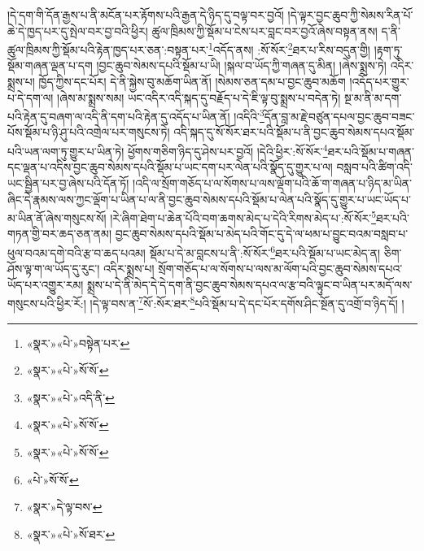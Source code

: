 །དེ་དག་གི་དོན་རྒྱས་པ་ནི་མངོན་པར་རྟོགས་པའི་རྒྱན་དེ་ཉིད་དུ་བལྟ་བར་བྱའོ། །དེ་ལྟར་བྱང་ཆུབ་ཀྱི་སེམས་རིན་པོ་ཆེ་དེ་ཁྱད་པར་དུ་སྤེལ་བར་བྱ་བའི་ཕྱིར། ཚུལ་ཁྲིམས་ཀྱི་སྡོམ་པ་ངེས་པར་བླང་བར་བྱའོ་ཞེས་བསྟན་ནས། ད་ནི་ཚུལ་ཁྲིམས་ཀྱི་སྡོམ་པའི་རྟེན་ཁྱད་པར་ཅན་:བསྟན་པར་\footnote{«སྣར་»«པེ་»བསྟེན་པར་}འདོད་ནས། :སོ་སོར་\footnote{«སྣར་»«པེ་»སོ་སོ་}ཐར་པ་རིས་བདུན་གྱི། །རྟག་ཏུ་སྡོམ་གཞན་ལྡན་པ་དག །བྱང་ཆུབ་སེམས་དཔའི་སྡོམ་པ་ཡི། །སྐལ་བ་ཡོད་ཀྱི་གཞན་དུ་མིན། །ཞེས་སྨྲས་ཏེ། འདིར་སྨྲས་པ། ཁྱོད་ཀྱིས་དང་པོར། དེ་ནི་སྐྱེས་བུ་མཆོག་ཡིན་ནོ། །སེམས་ཅན་དམ་པ་བྱང་ཆུབ་མཆོག །འདོད་པར་གྱུར་པ་དེ་དག་ལ། །ཞེས་མ་སྨྲས་སམ། ཡང་འདིར་འདི་སྐད་དུ་བརྗོད་པ་དེ་ཇི་ལྟ་བུ་སྨྲས་པ་བདེན་ཏེ། སྔ་མ་ནི་མ་དག་པའི་རྟེན་དུ་བཞག་ལ་འདི་ནི་དག་པའི་རྟེན་དུ་འདོད་པ་ཡིན་ནོ། །འདིའི་\footnote{«སྣར་»«པེ་»འདི་ནི་}དོན་བླ་མ་རྗེ་བཙུན་དཔལ་བྱང་ཆུབ་བཟང་པོས་སྡོམ་པ་ཉི་ཤུ་པའི་འགྲེལ་པར་གསུངས་ཏེ། འདི་སྐད་དུ་སོ་སོར་ཐར་པའི་སྡོམ་པ་ནི་བྱང་ཆུབ་སེམས་དཔའ་སྡོམ་པའི་ཡན་ལག་ཏུ་གྱུར་པ་ཡིན་ཏེ། ཕྱོགས་གཅིག་ཉིད་དུ་ཤེས་པར་བྱའོ། །དེའི་ཕྱིར་:སོ་སོར་\footnote{«སྣར་»«པེ་»སོ་སོ་}ཐར་པའི་སྡོམ་པ་གཞན་དང་ལྡན་པ་འདིས་བྱང་ཆུབ་སེམས་དཔའི་སྡོམ་པ་ཡང་དག་པར་ལེན་པའི་སྣོད་དུ་གྱུར་པ་ལ། བསླབ་པའི་ཚིག་འདི་ཡང་སྦྱིན་པར་བྱ་ཞེས་པའི་དོན་ཏོ། །འདི་ལ་སྲོག་གཅོད་པ་ལ་སོགས་པ་ལས་ལྡོག་པའི་ཆོ་ག་གཞན་པ་ཉིད་མ་ཡིན་ཞིང་དེ་རྣམས་ལས་ཀྱང་ལྡོག་པ་ཡིན་པ་ལ་ནི་བྱང་ཆུབ་སེམས་དཔའི་སྡོམ་པ་ལེན་པའི་སྣོད་དུ་གྱུར་པ་ཡང་ཡོད་པ་མ་ཡིན་ནོ་ཞེས་གསུངས་སོ། །རེ་ཞིག་ཐེག་པ་ཆེན་པོའི་བག་ཆགས་མེད་པ་དེའི་རིགས་མེད་པ་:སོ་སོར་\footnote{«སྣར་»«པེ་»སོ་སོ་}ཐར་པའི་གཏན་གྱི་བར་ཆད་ཅན་ནམ། བྱང་ཆུབ་སེམས་དཔའི་སྡོམ་པ་མེད་པའི་གོང་དུ་དེ་ལ་ཕམ་པ་བྱུང་བའམ་བསླབ་པ་ཕུལ་བའམ་དགེ་བའི་རྩ་བ་ཆད་པའམ། སྡོམ་པ་དེ་མ་བླངས་པ་ནི་:སོ་སོར་\footnote{«པེ་»སོ་སོ་}ཐར་པའི་སྡོམ་པ་ཡང་མེད་ན། ཅིག་ཤོས་ལྟ་ག་ལ་ཡོད་དུ་རུང་། འདིར་སྨྲས་པ། སྲོག་གཅོད་པ་ལ་སོགས་པ་ལས་མ་ལོག་པའི་བྱང་ཆུབ་སེམས་དཔའ་ཡོད་པར་འགྱུར་རམ། སྨྲས་པ་དེ་ནི་མེད་དེ་དེ་དག་ནི་བྱང་ཆུབ་སེམས་དཔའ་ལ་རྩ་བའི་ལྟུང་བ་ཡིན་པར་མདོ་ལས་གསུངས་པའི་ཕྱིར་རོ:། །དེ་ལྟ་བས་ན་\footnote{«སྣར་»དེ་ལྟ་བས་}སོ་:སོར་ཐར་\footnote{«སྣར་»«པེ་»སོ་ཐར་}པའི་སྡོམ་པ་དེ་དང་པོར་དགོས་ཤིང་སྔོན་དུ་འགྲོ་བ་ཉིད་དོ། །
